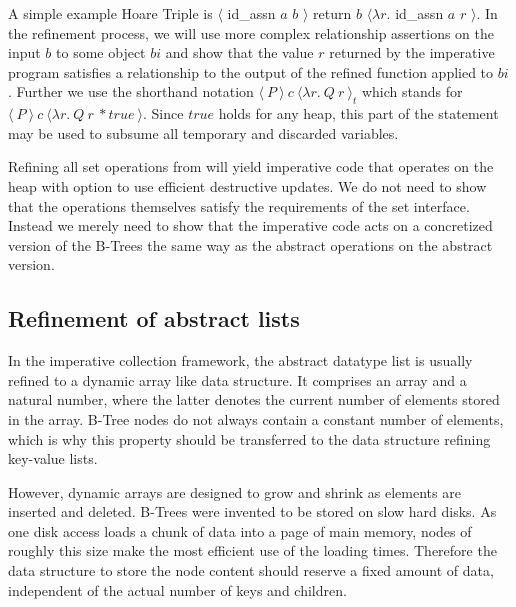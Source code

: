 A simple example Hoare Triple is 
$\langle$ id\_assn $a$ $b$ $\rangle$ return $b$ $\langle \lambda r.$ id\_assn $a$ $r$ $\rangle$.
In the refinement process, we will use more complex relationship assertions
on the input $b$ to some object $bi$ and show that the value $r$ returned
by the imperative program satisfies a relationship to the output of the refined
function applied to $bi$.
Further we use the shorthand notation $\langle\ P\ \rangle\ c\ \langle \lambda r.\ Q\ r\ \rangle_t$
which stands for $\langle\ P\ \rangle\ c\ \langle \lambda r.\ Q\ r\ * true\ \rangle$.
Since $true$ holds for any heap, this part of the statement may be used to subsume
all temporary and discarded variables.

Refining all set operations from 
will yield imperative code that operates on the heap
with option to use efficient destructive updates.
We do not need to show that the operations themselves
satisfy the requirements of the set interface.
Instead we merely need to show that the imperative code
acts on a concretized version of the B-Trees
the same way as the abstract operations on the abstract version.


\subsection{Refinement of abstract lists}

In the imperative collection framework\parencite{DBLP:journals/jar/Lammich19},
the abstract datatype list is usually
refined to a dynamic array like data structure.
It comprises an array and a natural number,
where the latter denotes the current number of elements
stored in the array.
B-Tree nodes do not always contain a constant number of elements,
which is why this property should be transferred to
the data structure refining key-value lists. 

However, dynamic arrays are designed to grow and shrink
as elements are inserted and deleted.
B-Trees were invented to be stored on slow hard disks.
As one disk access loads a chunk of data into a page of main memory,
nodes of roughly this size make the most efficient use of the loading times.
\parencite{DBLP:journals/acta/BayerM72}
Therefore the data structure to store the node content
should reserve a fixed amount of data, independent
of the actual number of keys and children.

